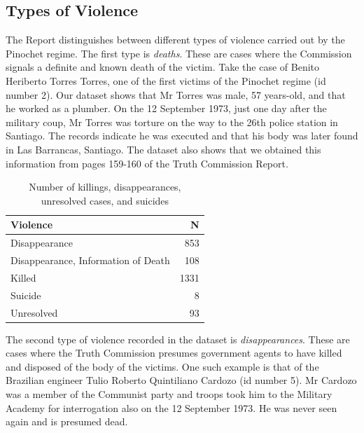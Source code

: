 \documentclass[12pt,a4paper,]{article}
\begin{document}
\vspace{.5cm}

\hypertarget{types-of-violence}{%
\subsection{Types of Violence}\label{types-of-violence}}

The Report distinguishes between different types of violence carried out
by the Pinochet regime. The first type is \emph{deaths}. These are cases
where the Commission signals a definite and known death of the victim.
Take the case of Benito Heriberto Torres Torres, one of the first
victims of the Pinochet regime (id number 2). Our dataset shows that Mr
Torres was male, 57 years-old, and that he worked as a plumber. On the
12 September 1973, just one day after the military coup, Mr Torres was
torture on the way to the 26th police station in Santiago. The records
indicate he was executed and that his body was later found in Las
Barrancas, Santiago. The dataset also shows that we obtained this
information from pages 159-160 of the Truth Commission Report.

\vspace{.5cm}

\begin{table}[!h]

\caption{\label{tab:number}Number of killings, disappearances, unresolved cases, and suicides}
\centering
\begin{tabular}{lr}
\toprule
Violence & N\\
\midrule
Disappearance & 853\\
Disappearance, Information of Death & 108\\
Killed & 1331\\
Suicide & 8\\
Unresolved & 93\\
\bottomrule
\end{tabular}
\end{table}

\vspace{.5cm}

The second type of violence recorded in the dataset is
\emph{disappearances}. These are cases where the Truth Commission
presumes government agents to have killed and disposed of the body of
the victims. One such example is that of the Brazilian engineer Tulio
Roberto Quintiliano Cardozo (id number 5). Mr Cardozo was a member of
the Communist party and troops took him to the Military Academy for
interrogation also on the 12 September 1973. He was never seen again and
is presumed dead.
\end{document}
